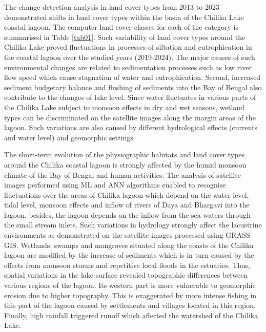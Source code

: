 \documentclass[jmse,article,submit,pdftex,moreauthors]{Definitions/mdpi}
\begin{document}
The change detection analysis in land cover types from 2013 to 2023 demonstrated shifts in land cover types within the basin of the Chilika Lake coastal lagoon. The computer land cover classes for each of the category is summarised in Table \ref{tab01}. Such variability of land cover types around the Chilika Lake proved fluctuations in processes of siltation and eutrophication in the coastal lagoon over the studied years (2019-2024). The major causes of such environmental changes are related to sedimentation processes such as low river flow speed which cause stagnation of water and eutrophication. Second, increased sediment budgetary balance and flushing of sediments into the Bay of Bengal also contribute to the changes of lake level. Since water fluctuates in various parts of the Chilika Lake subject to monsoon effects in dry and wet seasons, wetland types can be discriminated on the satellite images along the margin areas of the lagoon. Such variations are also caused by different hydrological effects (currents and water level) and geomorphic settings. 

The short-term evolution of the physiographic habitats and land cover types around the Chilika coastal lagoon is strongly affected by the humid monsoon climate of the Bay of Bengal and human activities. The analysis of satellite images performed using ML and ANN algorithms enabled to recognise fluctuations over the areas of Chilika lagoon which depend on the water level, tidal level, monsoon effects and inflow of rivers of Daya and Bhargavi into the lagoon. besides, the lagoon depends on the inflow from the sea waters through the small stream inlets. Such variations in hydrology strongly affect the lacustrine environments as demonstrated on the satellite images processed using GRASS GIS. Wetlands, swamps and mangroves situated along the coasts of the Chilika lagoon are modified by the increase of sediments which is in turn caused by the effects from monsoon storms and repetitive local floods in the estuaries. Thus, spatial variations in the lake surface revealed topographic differences between various regions of the lagoon. Its western part is more vulnerable to geomorphic erosion due to higher topography. This is exaggerated by more intense fishing in this part of the lagoon caused by settlements and villages located in this region. Finally, high rainfall triggered runoff which affected the watershed of the Chilika Lake. 
\end{document}
